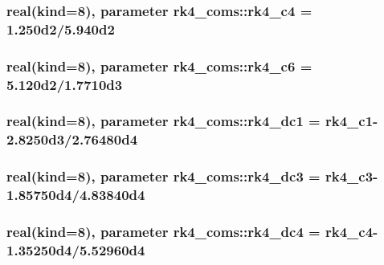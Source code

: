 \subsubsection[{rk4\+\_\+c4}]{\setlength{\rightskip}{0pt plus 5cm}real(kind=8), parameter rk4\+\_\+coms\+::rk4\+\_\+c4 = 1.\+250d2/5.\+940d2}\label{namespacerk4__coms_ae29e60a0912723f4124b219bb67135d8}
\hypertarget{namespacerk4__coms_a50aa680b806d041ad4b2d83b838ce6e4}{}
\subsubsection[{rk4\+\_\+c6}]{\setlength{\rightskip}{0pt plus 5cm}real(kind=8), parameter rk4\+\_\+coms\+::rk4\+\_\+c6 = 5.\+120d2/1.\+7710d3}\label{namespacerk4__coms_a50aa680b806d041ad4b2d83b838ce6e4}
\hypertarget{namespacerk4__coms_a8f2ecc1ddfd20579092c340f3cde39b4}{}
\subsubsection[{rk4\+\_\+dc1}]{\setlength{\rightskip}{0pt plus 5cm}real(kind=8), parameter rk4\+\_\+coms\+::rk4\+\_\+dc1 = {\bf rk4\+\_\+c1}-\/2.\+8250d3/2.\+76480d4}\label{namespacerk4__coms_a8f2ecc1ddfd20579092c340f3cde39b4}
\hypertarget{namespacerk4__coms_ad50fbfa221dd0da30f0c1f4bbc5d4f3e}{}
\subsubsection[{rk4\+\_\+dc3}]{\setlength{\rightskip}{0pt plus 5cm}real(kind=8), parameter rk4\+\_\+coms\+::rk4\+\_\+dc3 = {\bf rk4\+\_\+c3}-\/1.\+85750d4/4.\+83840d4}\label{namespacerk4__coms_ad50fbfa221dd0da30f0c1f4bbc5d4f3e}
\hypertarget{namespacerk4__coms_a1bb5b9bcaddfd294bf37a8ea838adf3f}{}
\subsubsection[{rk4\+\_\+dc4}]{\setlength{\rightskip}{0pt plus 5cm}real(kind=8), parameter rk4\+\_\+coms\+::rk4\+\_\+dc4 = {\bf rk4\+\_\+c4}-\/1.\+35250d4/5.\+52960d4}\label{namespacerk4__coms_a1bb5b9bcaddfd294bf37a8ea838adf3f}
\hypertarget{namespacerk4__coms_aa2ab2d5fa0e976ca56e10da08c4409a6}{}
